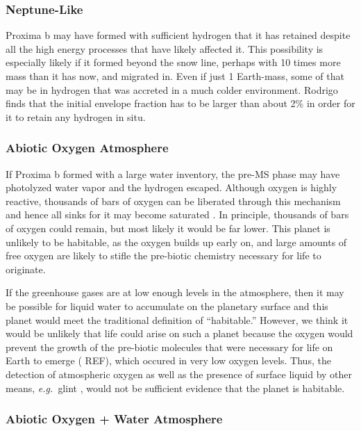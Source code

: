 \documentclass[preprint,12pt]{aastex}
\newcommand{\xxx}[1]{{\color{red} #1}} %
\def\eg{{\it e.g.\ }}
\begin{document}
\subsubsection{Neptune-Like}
\label{sec:results:atmstates:neptunelike}

Proxima b may have formed with sufficient hydrogen that it has
retained despite all the high energy processes that have likely
affected it. This possibility is especially likely if it formed beyond
the snow line, perhaps with 10 times more mass than it has now, and
migrated in. Even if just 1 Earth-mass, some of that may be in
hydrogen that was accreted in a much colder environment.
\xxx{Rodrigo finds that the initial envelope fraction has to be larger
than about 2\% in order for it to retain any hydrogen in situ.}

\subsubsection{Abiotic Oxygen Atmosphere}
\label{sec:results:atmstates:o2atmos}

If Proxima b formed with a large water inventory, the pre-MS phase may
have photolyzed water vapor and the hydrogen escaped. Although oxygen
is highly reactive, thousands of bars of oxygen can be liberated
through this mechanism \citep{LugerBarnes15} and hence all sinks for
it may become saturated \citep{Schaefer16}. In principle, thousands of
bars of oxygen could remain, but most likely it would be far
lower. This planet is unlikely to be habitable, as the oxygen builds
up early on, and large amounts of free oxygen are likely to stifle the
pre-biotic chemistry necessary for life to originate.

If the greenhouse gases are at low enough levels in the atmosphere,
then it may be possible for liquid water to accumulate on the
planetary surface and this planet would meet the traditional
definition of ``habitable.'' However, we think it would be unlikely
that life could arise on such a planet because the oxygen would
prevent the growth of the pre-biotic molecules that were necessary for
life on Earth to emerge (\xxx{REF}), which occured in very low oxygen
levels. Thus, the detection of atmospheric oxygen as well as the
presence of surface liquid by other means, \eg glint
\citep{Robinson10}, would not be sufficient evidence that the planet
is habitable.

\subsubsection{Abiotic Oxygen + Water Atmosphere}
\label{sec:results:atmstates:o2h2oatmos}
\end{document}
